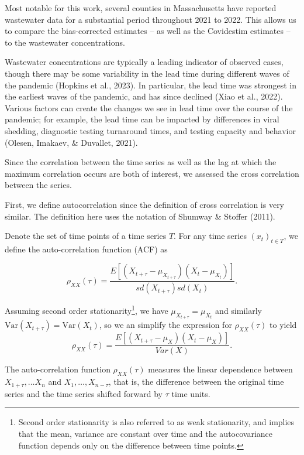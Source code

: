 \documentclass[12pt,twoside]{smiththesis}
\begin{document}
Most notable for this work, several counties in Massachusetts have reported wastewater data for a substantial period throughout 2021 to 2022. This allows us to compare the bias-corrected estimates -- as well as the Covidestim estimates -- to the wastewater concentrations.

Wastewater concentrations are typically a leading indicator of observed cases, though there may be some variability in the lead time during different waves of the pandemic (Hopkins et al., 2023). In particular, the lead time was strongest in the earliest waves of the pandemic, and has since declined (Xiao et al., 2022). Various factors can create the changes we see in lead time over the course of the pandemic; for example, the lead time can be impacted by differences in viral shedding, diagnostic testing turnaround times, and testing capacity and behavior (Olesen, Imakaev, \& Duvallet, 2021).

Since the correlation between the time series as well as the lag at which the maximum correlation occurs are both of interest, we assessed the cross correlation between the series.

First, we define autocorrelation since the definition of cross correlation is very similar. The definition here uses the notation of Shumway \& Stoffer (2011).
\begin{tcolorbox}[title=Definition: Autocorrelation]

Denote the set of time points of a time series $T$. For any time series $(x_t)_{t\in T}$, we define the auto-correlation function (ACF)  as 

$$\rho_{XX}(\tau) = \dfrac{E[(X_{t + \tau} - \mu_{X_{t+\tau}}) (X_t - \mu_{X_t})]}{sd(X_{t+\tau}) sd(X_t)}.$$
\end{tcolorbox}
Assuming second order stationarity\footnote{Second order stationarity is also referred to as weak stationarity, and implies that the mean, variance are constant over time and the autocovariance function depends only on the difference between time points.}, we have \(\mu_{X_{t+\tau}}=\mu_{X_{t}}\)
and similarly \(\text{Var}({X_{t+\tau}})=\text{Var}({X_{t}})\), so we an simplify the expression for \(\rho_{XX} (\tau)\) to yield\\
\[\rho_{XX} (\tau)=\dfrac{E[(X_{t + \tau} - \mu_{X}) (X_t - \mu_{X})]}{Var(X)}.\]

The auto-correlation function \(\rho_{XX}(\tau)\) measures the linear dependence between \(X_{1+\tau}, \dots X_n\) and \(X_1, \dots, X_{n-\tau}\), that is, the difference between the original time series and the time series shifted forward by \(\tau\) time units.
\end{document}
